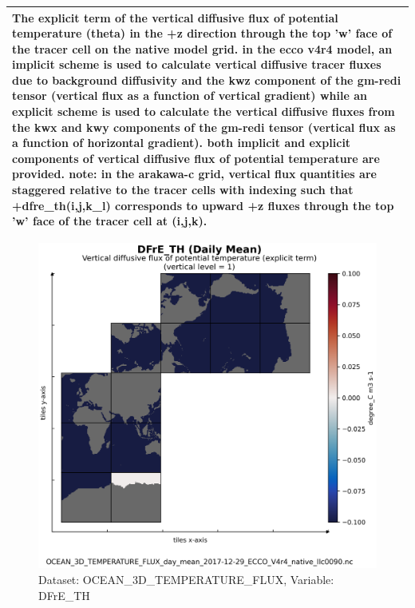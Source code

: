 \begin{longtable}{|m{}|m{}|m{}|m{}|}
\multicolumn{4}{|p{1\textwidth}|}{\footnotesize{{The explicit term of the vertical diffusive flux of potential temperature (theta) in the +z direction through the top 'w' face of the tracer cell on the native model grid. in the ecco v4r4 model, an implicit scheme is used to calculate vertical diffusive tracer fluxes due to background diffusivity and the kwz component of the gm-redi tensor (vertical flux as a function of vertical gradient) while an explicit scheme is used to calculate the vertical diffusive fluxes from the kwx and kwy components of the gm-redi tensor (vertical flux as a function of horizontal gradient). both implicit and explicit components of vertical diffusive flux of potential temperature are provided. note: in the arakawa-c grid, vertical flux quantities are staggered relative to the tracer cells with indexing such that +dfre\_th(i,j,k\_l) corresponds to upward +z fluxes through the top 'w' face of the tracer cell at (i,j,k).}}} \\ \hline
\end{longtable}

\begin{figure}[H]
\centering
\includegraphics[scale=0.55]{../images/plots/v4r4/native_plots/Ocean_Three-Dimensional_Potential_Temperature_Fluxes/DFrE_TH.png}
\caption{Dataset: OCEAN\_3D\_TEMPERATURE\_FLUX, Variable: DFrE\_TH}
\label{tab:table-OCEAN_3D_TEMPERATURE_FLUX_DFrE_TH-Plot}
\end{figure}
\newpage
\pagebreak
